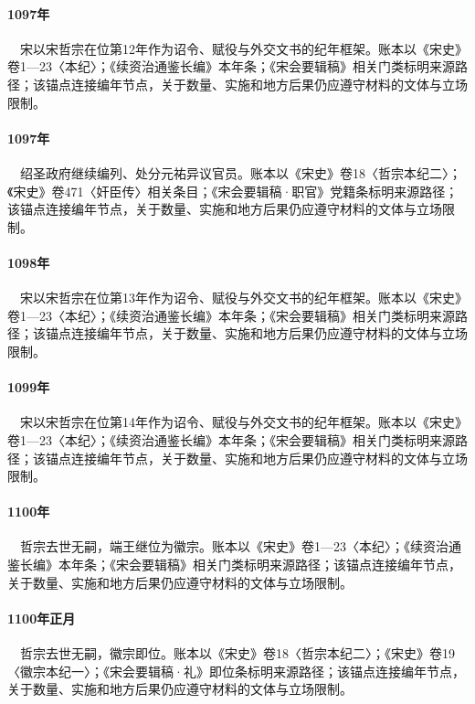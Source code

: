 \paragraph{1097年}　宋以宋哲宗在位第12年作为诏令、赋役与外交文书的纪年框架。账本以《宋史》卷1—23〈本纪〉；《续资治通鉴长编》本年条；《宋会要辑稿》相关门类标明来源路径；该锚点连接编年节点，关于数量、实施和地方后果仍应遵守材料的文体与立场限制。

\paragraph{1097年}　绍圣政府继续编列、处分元祐异议官员。账本以《宋史》卷18〈哲宗本纪二〉；《宋史》卷471〈奸臣传〉相关条目；《宋会要辑稿·职官》党籍条标明来源路径；该锚点连接编年节点，关于数量、实施和地方后果仍应遵守材料的文体与立场限制。

\paragraph{1098年}　宋以宋哲宗在位第13年作为诏令、赋役与外交文书的纪年框架。账本以《宋史》卷1—23〈本纪〉；《续资治通鉴长编》本年条；《宋会要辑稿》相关门类标明来源路径；该锚点连接编年节点，关于数量、实施和地方后果仍应遵守材料的文体与立场限制。

\paragraph{1099年}　宋以宋哲宗在位第14年作为诏令、赋役与外交文书的纪年框架。账本以《宋史》卷1—23〈本纪〉；《续资治通鉴长编》本年条；《宋会要辑稿》相关门类标明来源路径；该锚点连接编年节点，关于数量、实施和地方后果仍应遵守材料的文体与立场限制。

\paragraph{1100年}　哲宗去世无嗣，端王继位为徽宗。账本以《宋史》卷1—23〈本纪〉；《续资治通鉴长编》本年条；《宋会要辑稿》相关门类标明来源路径；该锚点连接编年节点，关于数量、实施和地方后果仍应遵守材料的文体与立场限制。

\paragraph{1100年正月}　哲宗去世无嗣，徽宗即位。账本以《宋史》卷18〈哲宗本纪二〉；《宋史》卷19〈徽宗本纪一〉；《宋会要辑稿·礼》即位条标明来源路径；该锚点连接编年节点，关于数量、实施和地方后果仍应遵守材料的文体与立场限制。

